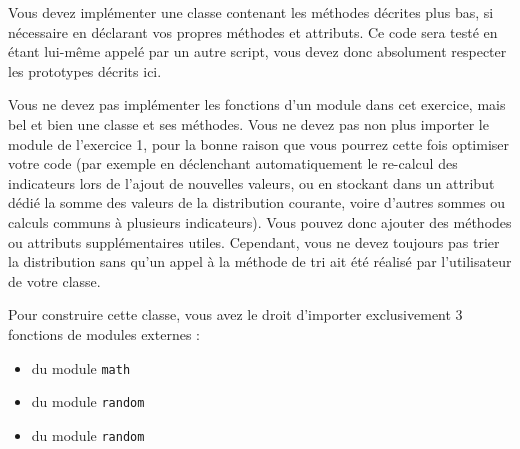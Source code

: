 

\vspace*{0.7cm}

\noindent {}

\bigskip

\noindent Vous devez implémenter une classe  contenant les méthodes décrites plus bas, si nécessaire en déclarant vos propres méthodes et attributs.
Ce code sera testé en étant lui-même appelé par un autre script, vous devez donc absolument respecter les prototypes décrits ici.

\bigskip

\noindent Vous ne devez pas implémenter les fonctions d'un module dans cet exercice, mais bel et bien une classe et ses méthodes.
Vous ne devez pas non plus importer le module de l'exercice 1, pour la bonne raison que vous pourrez cette fois optimiser votre code (par exemple en déclenchant automatiquement le re-calcul des indicateurs lors de l'ajout de nouvelles valeurs, ou en stockant dans un attribut dédié la somme des valeurs de la distribution courante, voire d'autres sommes ou calculs communs à plusieurs indicateurs).
Vous pouvez donc ajouter des méthodes ou attributs supplémentaires utiles.
Cependant, vous ne devez toujours pas trier la distribution sans qu'un appel à la méthode de tri ait été réalisé par l'utilisateur de votre classe.

\bigskip

\noindent Pour construire cette classe, vous avez le droit d'importer exclusivement 3 fonctions de modules externes :

\begin{itemize}
\item {} du module \texttt{math}
\item {} du module \texttt{random}
\item {} du module \texttt{random}
\end{itemize}

